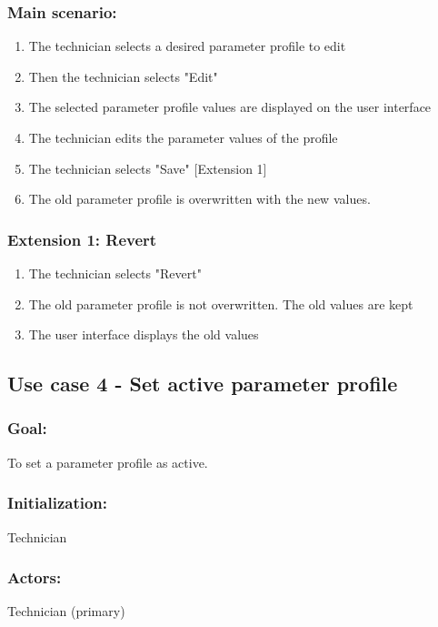 \subsubsection*{Main scenario:}
\begin{enumerate}
\item The technician selects a desired parameter profile to edit
\item Then the technician selects "Edit"
\item The selected parameter profile values are displayed on the user interface
\item The technician edits the parameter values of the profile
\item The technician selects "Save" [Extension 1]
\item The old parameter profile is overwritten with the new values.
\end{enumerate}	

\subsubsection*{Extension 1: Revert}
\begin{enumerate}
	\item The technician selects "Revert"
	\item The old parameter profile is not overwritten. The old values are kept
	\item The user interface displays the old values
\end{enumerate}


\subsection{Use case 4 - Set active parameter profile}
\subsubsection*{Goal:}
To set a parameter profile as active.

\subsubsection*{Initialization:}
Technician

\subsubsection*{Actors:}
Technician (primary)


